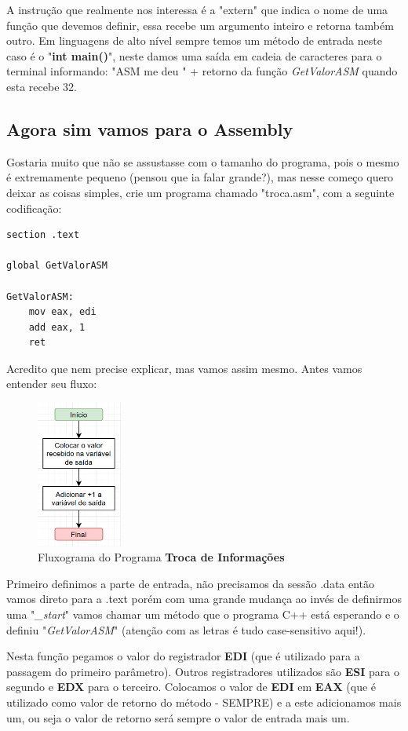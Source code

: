 A instrução que realmente nos interessa é a "extern" que indica o nome de uma função que devemos definir, essa recebe um argumento inteiro e retorna também outro. Em linguagens de alto nível sempre temos um método de entrada neste caso é o "\textbf{int main()}", neste damos uma saída em cadeia de caracteres para o terminal informando: "ASM me deu " + retorno da função \textit{GetValorASM} quando esta recebe 32.

\subsection{Agora sim vamos para o Assembly}
Gostaria muito que não se assustasse com o tamanho do programa, pois o mesmo é extremamente pequeno (pensou que ia falar grande?), mas nesse começo quero deixar as coisas simples, crie um programa chamado "troca.asm", com a seguinte codificação:
\begin{lstlisting}[]
section .text

global GetValorASM

GetValorASM:
	mov eax, edi
	add eax, 1
	ret	
\end{lstlisting}

Acredito que nem precise explicar, mas vamos assim mesmo. Antes vamos entender seu fluxo:
\begin{figure}[H]
	\centering
	\includegraphics[width=0.25\textwidth]{Pictures/cap02/programa5}
	\caption{Fluxograma do Programa \textbf{Troca de Informações}}
\end{figure}

Primeiro definimos a parte de entrada, não precisamos da sessão .data então vamos direto para a .text porém com uma grande mudança ao invés de definirmos uma "\textit{\_start}" vamos chamar um método que o programa C++ está esperando e o definiu "\textit{GetValorASM}" (atenção com as letras é tudo case-sensitivo aqui!). 

Nesta função pegamos o valor do registrador \textbf{EDI} (que é utilizado para a passagem do primeiro parâmetro). Outros registradores utilizados são \textbf{ESI} para o segundo e \textbf{EDX} para o terceiro. Colocamos o valor de \textbf{EDI} em \textbf{EAX} (que é utilizado como valor de retorno do método - SEMPRE) e a este adicionamos mais um, ou seja o valor de retorno será sempre o valor de entrada mais um.

